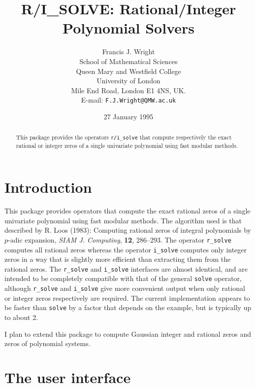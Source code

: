 
\title{R/I\_SOLVE: Rational/Integer Polynomial Solvers}

\author{Francis J. Wright \\
School of Mathematical Sciences \\
Queen Mary and Westfield College \\
University of London \\
Mile End Road, London E1 4NS, UK. \\
E-mail: {\tt F.J.Wright@QMW.ac.uk}}

\date{27 January 1995}


\maketitle

\begin{abstract}
  This package provides the operators \verb|r/i_solve| that compute
  respectively the exact rational or integer zeros of a single
  univariate polynomial using fast modular methods.
\end{abstract}


\section{Introduction}

This package provides operators that compute the exact rational zeros
of a single univariate polynomial using fast modular methods.  The
algorithm used is that described by R. Loos (1983): Computing rational
zeros of integral polynomials by $p$-adic expansion, {\it SIAM J.
Computing}, {\bf 12}, 286--293.  The operator \verb|r_solve| computes
all rational zeros whereas the operator \verb|i_solve| computes only
integer zeros in a way that is slightly more efficient than extracting
them from the rational zeros.  The \verb|r_solve| and \verb|i_solve|
interfaces are almost identical, and are intended to be completely
compatible with that of the general \verb|solve| operator, although
\verb|r_solve| and \verb|i_solve| give more convenient output when
only rational or integer zeros respectively are required.  The current
implementation appears to be faster than \verb|solve| by a factor that
depends on the example, but is typically up to about 2.
  
I plan to extend this package to compute Gaussian integer and rational
zeros and zeros of polynomial systems.


\section{The user interface}

